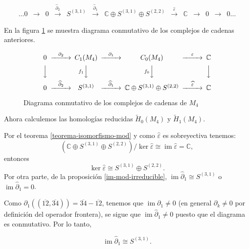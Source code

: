 \documentclass[12pt]{book}
\theoremstyle{definition}
\DeclareMathOperator{\im}{im}
\newcounter{in}
\newcounter{ini}
\begin{document}
\begin{small}
    \[
    \begin{array}{ccccccccccccc}
      \dots 0 & \rightarrow & 0 &
      \stackrel{\widehat\partial_{2}}{\rightarrow} &  S^{(3,1)} &
      \stackrel{\widehat\partial_{1}}{\rightarrow} & \mathbb{C} \oplus
      S^{(3,1)}\oplus S^{(2,2)} & \stackrel{\widehat\varepsilon}{\rightarrow} &
      \mathbb{C} & \rightarrow  & 0 & \rightarrow & 0 \dots
    \end{array} 
    \]
  \end{small}

En la figura \ref{fig:diagrama-conmutativo4} se muestra diagrama
conmutativo de los complejos de cadenas anteriores.
\begin{figure}[!hbtp]
  \centering
  \[
  \begin{CD}
    0 @>{\partial_{2}}>> C_{1}(M_{4}) @>{\partial_{1}}>> C_{0}(M_{4}) @>{\varepsilon}>> \mathbb{C}\\
    @VVV   @V{f_{1}}VV   @V{f_{0}}VV   @VVV    \\
    0 @>{\widehat\partial_{2}}>> S^{(3,1)} @>{\widehat\partial_{1}}>>
    \mathbb{C} \oplus S^{(3,1)}\oplus S^{(2,2)} @>{\widehat
      \varepsilon}>> \mathbb{C}
  \end{CD}
  \]
  
  \caption{Diagrama conmutativo de los complejos de cadenas de $M_{4}$}
\label{fig:diagrama-conmutativo4}
\end{figure}

Ahora calculemos las homologías reducidas $\widetilde H_{0}(M_{4})$ y
$\widetilde H_{1}(M_{4})$.

Por el teorema \ref{teorema-isomorfismo-mod} y como
$\widehat\varepsilon$ es sobreyectiva tenemos:
$$(\mathbb{C} \oplus S^{(3,1)}\oplus S^{(2,2)})/\ker\widehat\varepsilon\cong\im\widehat\varepsilon=\mathbb{C},$$
entonces
\begin{equation}
\label{ker-0-4}
\ker\widehat\varepsilon\cong S^{(3,1)}\oplus S^{(2,2)}.
\end{equation}
Por otra parte, de la proposición \ref{im-mod-irreducible}, $\im\widehat\partial_{1}\cong S^{(3,1)}$ o $\im\widehat\partial_{1}=0$.

Como $\partial_{1}((\overline{12},\overline{34}))=\overline{34}-\overline{12}$,
tenemos que $\im\partial_{1}\neq 0$ (en general $\partial_{k}\neq 0$
por definición del operador frontera), se sigue que
$\im\widehat\partial_{1}\neq 0$ puesto que el diagrama es
conmutativo. Por lo tanto, 

\begin{equation}
  \label{im-1-4}
  \im\widehat\partial_{1}\cong S^{(3,1)}.
\end{equation}
\end{document}
